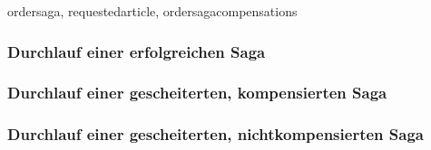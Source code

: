ordersaga, requestedarticle, ordersagacompensations

\subsubsection{Durchlauf einer erfolgreichen Saga}

\subsubsection{Durchlauf einer gescheiterten, kompensierten Saga}

\subsubsection{Durchlauf einer gescheiterten, nichtkompensierten Saga}
